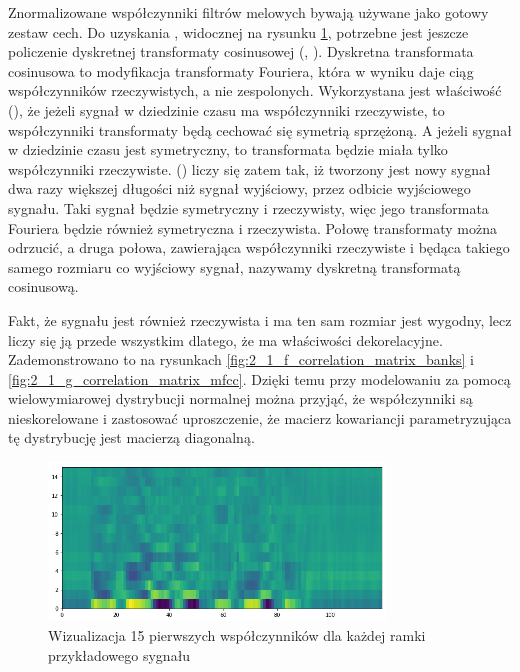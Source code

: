 Znormalizowane współczynniki filtrów melowych bywają używane jako gotowy zestaw cech. Do uzyskania ,
widocznej na rysunku \ref{fig:2_1_e_mfcc},
potrzebne jest jeszcze policzenie dyskretnej transformaty cosinusowej (,
). Dyskretna transformata cosinusowa to modyfikacja
transformaty Fouriera, która w wyniku daje ciąg współczynników rzeczywistych, a nie zespolonych. Wykorzystana jest
właściwość  (), że jeżeli sygnał w dziedzinie czasu ma
współczynniki rzeczywiste, to współczynniki transformaty
będą cechować się symetrią sprzężoną. A jeżeli sygnał w dziedzinie czasu jest symetryczny,
to transformata będzie miała tylko współczynniki rzeczywiste. 
() liczy się zatem tak,
iż tworzony jest nowy sygnał dwa razy większej długości niż
sygnał wyjściowy, przez odbicie wyjściowego sygnału. Taki sygnał będzie symetryczny i rzeczywisty, więc jego transformata
Fouriera będzie również symetryczna i rzeczywista. Połowę transformaty można odrzucić, a druga połowa, zawierająca
współczynniki rzeczywiste i będąca takiego samego rozmiaru co wyjściowy sygnał, nazywamy dyskretną transformatą cosinusową.

Fakt, że  sygnału jest również rzeczywista i ma ten sam rozmiar jest wygodny, lecz liczy się
ją przede wszystkim dlatego, że ma właściwości dekorelacyjne. Zademonstrowano to na rysunkach
\ref{fig:2_1_f_correlation_matrix_banks} i \ref{fig:2_1_g_correlation_matrix_mfcc}.
Dzięki temu przy modelowaniu  za pomocą wielowymiarowej
dystrybucji normalnej można przyjąć, że
współczynniki są nieskorelowane i zastosować uproszczenie, że macierz kowariancji parametryzująca tę dystrybucję
jest macierzą diagonalną.

\begin{figure}[H]
    \centering
    \includegraphics[width=0.8\textwidth]{images/2_1_e_mfcc}
    \caption{Wizualizacja 15 pierwszych współczynników  dla każdej ramki przykładowego sygnału}
    \label{fig:2_1_e_mfcc}
\end{figure}

